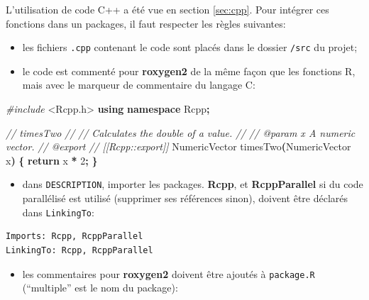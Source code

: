\documentclass[
  12pt,
  french,
  a4paper,
  extrafontsizes,onecolumn,openright
  ]{memoir}
\newenvironment{Shaded}{\begin{snugshade}}{\end{snugshade}}
\newcommand{\CommentTok}[1]{\textcolor[rgb]{0.56,0.35,0.01}{\textit{#1}}}
\newcommand{\ControlFlowTok}[1]{\textcolor[rgb]{0.13,0.29,0.53}{\textbf{#1}}}
\newcommand{\DecValTok}[1]{\textcolor[rgb]{0.00,0.00,0.81}{#1}}
\newcommand{\ImportTok}[1]{#1}
\newcommand{\KeywordTok}[1]{\textcolor[rgb]{0.13,0.29,0.53}{\textbf{#1}}}
\newcommand{\NormalTok}[1]{#1}
\newcommand{\OperatorTok}[1]{\textcolor[rgb]{0.81,0.36,0.00}{\textbf{#1}}}
\newcommand{\PreprocessorTok}[1]{\textcolor[rgb]{0.56,0.35,0.01}{\textit{#1}}}
\providecommand{\tightlist}{%
  \setlength{\itemsep}{0pt}\setlength{\parskip}{0pt}}
\begin{document}
L'utilisation de code C++ a été vue en section \ref{sec:cpp}.
Pour intégrer ces fonctions dans un packages, il faut respecter les règles suivantes:

\begin{itemize}
\tightlist
\item
  les fichiers \texttt{.cpp} contenant le code sont placés dans le dossier \texttt{/src} du projet;
\item
  le code est commenté pour \textbf{roxygen2} de la même façon que les fonctions R, mais avec le marqueur de commentaire du langage C:
\end{itemize}

\scriptsize

\begin{Shaded}
\begin{Highlighting}[]
\PreprocessorTok{\#include }\ImportTok{\textless{}Rcpp.h\textgreater{}}
\KeywordTok{using} \KeywordTok{namespace}\NormalTok{ Rcpp}\OperatorTok{;}

\CommentTok{//\textquotesingle{} timesTwo}
\CommentTok{//\textquotesingle{}}
\CommentTok{//\textquotesingle{} Calculates the double of a value.}
\CommentTok{//\textquotesingle{}}
\CommentTok{//\textquotesingle{} @param x A numeric vector.}
\CommentTok{//\textquotesingle{} @export}
\CommentTok{// [[Rcpp::export]]}
\NormalTok{NumericVector timesTwo}\OperatorTok{(}\NormalTok{NumericVector x}\OperatorTok{)} \OperatorTok{\{}
  \ControlFlowTok{return}\NormalTok{ x }\OperatorTok{*} \DecValTok{2}\OperatorTok{;}
\OperatorTok{\}}
\end{Highlighting}
\end{Shaded}

\normalsize

\begin{itemize}
\tightlist
\item
  dans \texttt{DESCRIPTION}, importer les packages.
  \textbf{Rcpp}, et \textbf{RcppParallel} si du code parallélisé est utilisé (supprimer ses références sinon), doivent être déclarés dans \texttt{LinkingTo}:
\end{itemize}

\begin{verbatim}
Imports: Rcpp, RcppParallel
LinkingTo: Rcpp, RcppParallel
\end{verbatim}

\begin{itemize}
\tightlist
\item
  les commentaires pour \textbf{roxygen2} doivent être ajoutés à \texttt{package.R} (\enquote{multiple} est le nom du package):
\end{itemize}
\end{document}

